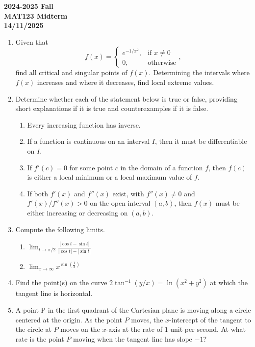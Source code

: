 \documentclass[a4paper, 12pt]{article}
\begin{document}
\begin{center}
\textbf{2024-2025 Fall \\MAT123 Midterm\\14/11/2025}
\end{center}

\begin{enumerate}[leftmargin=*,label=\textbf{\arabic*.}]
\item Given that
\[
f(x) =
\begin{cases}
e^{-1/x^2}, & \text{if } x\neq0 \\[1em]
0, & \text{otherwise}
\end{cases},
\]
find all critical and singular points of $f(x)$. Determining the intervals where $f(x)$ increases and where it decreases, find local extreme values.

\item Determine whether each of the statement below is true or false, providing short explanations if it is true and counterexamples if it is false.

\begin{enumerate}[leftmargin=*,label=\textbf{\alph*.}]
\item Every increasing function has inverse.
\item If a function is continuous on an interval $I$, then it must be differentiable on $I$.
\item If $f'(c)=0$ for some point $c$ in the domain of a function $f$, then $f(c)$ is either a local minimum or a local maximum value of $f$.
\item If both $f'(x)$ and $f''(x)$ exist, with $f''(x)\neq0$ and $f'(x)/f''(x)>0$ on the open interval $(a,b)$, then $f(x)$ must be either increasing or decreasing on $(a,b)$.
\end{enumerate}

\item Compute the following limits.
\begin{enumerate}[leftmargin=*,label=\textbf{\alph*.}]
\item $\displaystyle\lim_{t\to\pi/2}\frac{\left|\cos t-\sin t\right|}{\left|\cos t\right|-\left|\sin t\right|}$
\item $\displaystyle\lim_{x\to\infty} x^{\sin\left(\frac1x\right)}$
\end{enumerate}

\item Find the point(s) on the curve $2\tan^{-1}(y/x)=\ln\left(x^2+y^2\right)$ at which the tangent line is horizontal.

\item A point P in the first quadrant of the Cartesian plane is moving along a circle centered at the origin. As the point $P$ moves, the $x$-intercept of the tangent to the circle at $P$ moves on the $x$-axis at the rate of $1$ unit per second. At what rate is the point $P$ moving when the tangent line has slope $-1$?
\end{enumerate}
\end{document}
